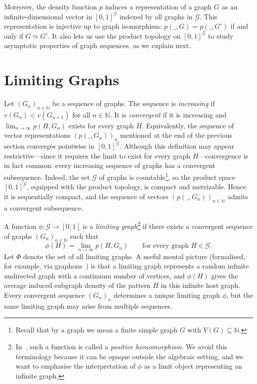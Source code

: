 \documentclass{article}
\begin{document}
Moreover, the density function $p$ induces a representation of a graph $G$ as an infinite-dimensional vector in $[0,1]^{\mathcal{G}}$ indexed by all graphs in $\mathcal{G}$. This representation is injective up to graph isomorphism: $p(\_,G)=p(\_,G')$ if and only if $G \simeq G'$. It also lets us use the product topology on $[0,1]^{\mathcal{G}}$ to study asymptotic properties of graph sequences, as we explain next.

\section{Limiting Graphs}
\label{sec:limiting-graphs}

Let $(G_n)_{n \in \mathbb{N}}$ be a sequence of graphs. The sequence is \emph{increasing} if
$v(G_n) < v(G_{n+1})$ for all $n \in \mathbb{N}$. It is \emph{convergent} if it is increasing and
$\lim_{n \to \infty} p(H, G_n)$ exists for every graph $H$. Equivalently, the sequence of vector
representations $(p(\_,G_n))_n$ mentioned at the end of the previous section converges pointwise in
$[0,1]^{\mathcal{G}}$.
Although this definition may appear restrictive---since it requires the limit to exist for every
graph $H$---convergence is in fact common: every increasing sequence of graphs has a convergent
subsequence. Indeed, the set $\mathcal{G}$ of graphs is countable\footnote{Recall that by a graph we mean a finite
simple graph $G$ with $V(G) \subseteq \mathbb{N}$.}, so the product space $[0,1]^{\mathcal{G}}$,
equipped with the product topology, is compact and metrizable. Hence it is sequentially compact,
and the sequence of vectors $(p(\_,G_n))_{n\in\mathbb{N}}$ admits a convergent subsequence.

A function $\phi : \mathcal{G} \to [0,1]$ is a \emph{limiting graph}\footnote{In~\cite{Razborov2007}, such a function is called a \emph{positive homomorphism}. We avoid this terminology because it can be opaque outside the algebraic setting, and we want to emphasise the interpretation of $\phi$ as a limit object representing an infinite graph.} if there exists a convergent sequence of graphs $(G_n)_{n \in \mathbb{N}}$ such that
\[
\phi(H) = \lim_{n \to \infty} p(H, G_n)
\qquad\text{for every graph } H \in \mathcal{G}.
\]
Let $\Phi$ denote the set of all limiting graphs. A useful mental picture (formalised, for example,
via graphons~\cite{Lovasz2012GraphonBook}) is that a limiting graph represents a random infinite undirected graph with a continuum number of vertices, and $\phi(H)$ gives the average induced subgraph density of the pattern $H$ in this infinite host graph.
Every convergent sequence $(G_n)_n$ determines a unique limiting graph $\phi$, but the same limiting
graph may arise from multiple sequences.
\end{document}
